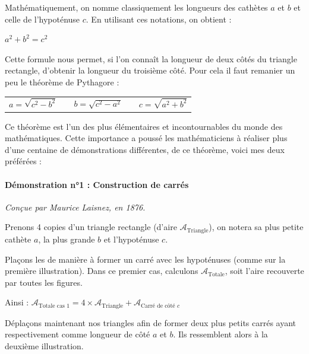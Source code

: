 \documentclass[a4paper, twoside]{article}
\begin{document}
Mathématiquement, on nomme classiquement les longueurs des cathètes $a$ et $b$ et celle
de l'hypoténuse $c$. En utilisant ces notations, on obtient :

\begin{center}
	$a^2 + b^2 = c^2$
\end{center}

Cette formule nous permet, si l'on connaît la longueur de deux côtés du triangle rectangle,
d'obtenir la longueur du troisième côté. Pour cela il faut remanier un peu le théorème de Pythagore :

\begin{center}
	\begin{tabular}{ccccc}
		$a = \sqrt{c^2 - b^2}$ &
		\phantom{text}         &
		$b = \sqrt{c^2 - a^2}$ &
		\phantom{text}         &
		$c = \sqrt{a^2 + b^2}$ \\
	\end{tabular}
\end{center}

\smallbreak

Ce théorème est l'un des plus élémentaires et incontournables du monde des mathématiques. 
Cette importance a poussé les mathématiciens à réaliser plus d'une centaine de démonstrations différentes, 
de ce théorème, voici mes deux préférées :

\paragraph*{Démonstration n°1 : Construction de carrés}

\textit{Conçue par Maurice Laisnez, en 1876.}

Prenons 4 copies d'un triangle rectangle (d'aire $\mathcal{A}_{\text{Triangle}}$), 
on notera sa plus petite cathète $a$, la plus grande $b$ et l'hypoténuse $c$.

Plaçons les de manière à former un carré avec les hypoténuses (comme sur la première illustration).
Dans ce premier cas, calculons $\mathcal{A}_{\text{Totale}}$, soit l'aire recouverte par toutes les figures.

Ainsi : $\mathcal{A}_{\text{Totale cas 1}} = 4 \times \mathcal{A}_{\text{Triangle}} + \mathcal{A}_{\text{Carré de côté }c}$

\medbreak

Déplaçons maintenant nos triangles afin de former deux plus petits carrés ayant respectivement 
comme longueur de côté $a$ et $b$. Ils ressemblent alors à la deuxième illustration. 
\end{document}
